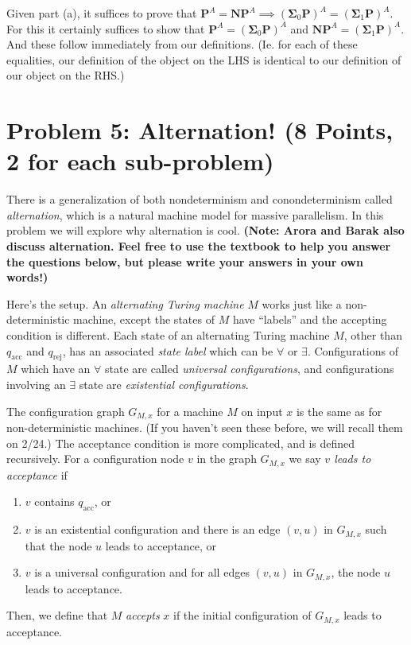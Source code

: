 \documentclass{article}
\renewcommand{\P}{\mathbf{P}}
\newcommand{\NP}{\mathbf{NP}}
\newcommand{\BSigma}{\mathbf{\Sigma}}
\begin{document}
Given part (a), it suffices to prove that $\P^A = \NP^A \implies (\BSigma_0 \P)^A = (\BSigma_1 \P)^A$.  For this it certainly suffices to show that $\P^A = (\BSigma_0 \P)^A$ and $\NP^A = (\BSigma_1 \P)^A$.  And these follow immediately from our definitions.  (Ie. for each of these equalities, our definition of the object on the LHS is identical to our definition of our object on the RHS.)


\section*{Problem 5: Alternation! (8 Points, 2 for each sub-problem)}

There is a generalization of both nondeterminism and conondeterminism called \emph{alternation}, which is a natural machine model for massive parallelism. In this problem we will explore why alternation is cool. {\bf (Note: Arora and Barak also discuss alternation. Feel free to use the textbook to help you answer the questions below, but please write your  answers in your own words!)}

Here's the setup. An {\em alternating Turing machine} $M$ works just like a non-deterministic machine, except the states of $M$ have ``labels'' and the accepting condition is different. Each state of an alternating Turing machine $M$, other than $q_{\text{acc}}$ and $q_{\text{rej}}$, has an associated \emph{state label} which can be $\forall$ or $\exists$. Configurations of $M$ which have an $\forall$ state are called {\em universal configurations}, and configurations involving an $\exists$ state are {\em existential configurations}. 

The configuration graph $G_{M,x}$ for a machine $M$ on input $x$ is the same as for non-deterministic machines. (If you haven't seen these before, we will recall them on 2/24.) The acceptance condition is more complicated, and is defined recursively. For a configuration node $v$ in the graph $G_{M,x}$ we say {\em $v$ leads to acceptance} if \begin{enumerate}
\item $v$ contains $q_{\text{acc}}$, or 
\item $v$ is an existential configuration and there is an edge $(v,u)$ in $G_{M,x}$ such that the node $u$ leads to acceptance, or 
\item $v$ is a universal configuration and for all edges $(v,u)$ in $G_{M,x}$, the node $u$ leads to acceptance. 
\end{enumerate}
Then, we define that $M$ \emph{accepts} $x$ if the initial
configuration of $G_{M,x}$ leads to acceptance. 
\end{document}
